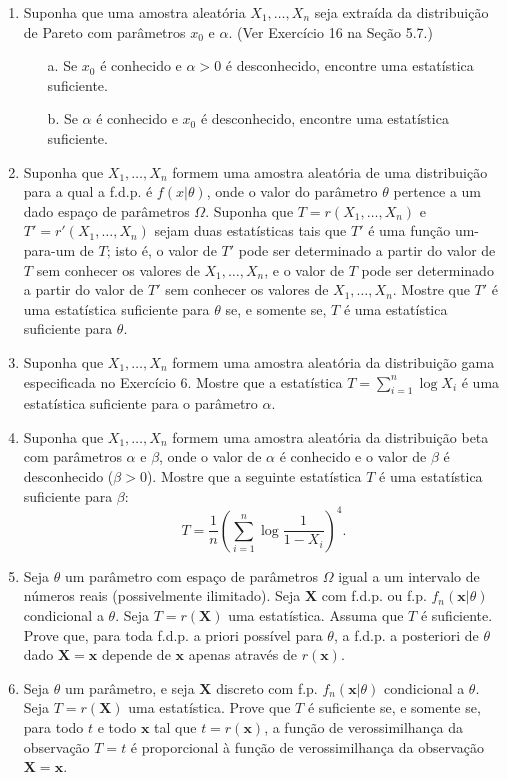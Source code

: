 \begin{enumerate}
    \item Suponha que uma amostra aleatória $X_1, \dots, X_n$ seja extraída da distribuição de Pareto com parâmetros $x_0$ e $\alpha$. (Ver Exercício 16 na Seção 5.7.)
    \begin{enumerate}
        \item[a.] Se $x_0$ é conhecido e $\alpha > 0$ é desconhecido, encontre uma estatística suficiente.
        \item[b.] Se $\alpha$ é conhecido e $x_0$ é desconhecido, encontre uma estatística suficiente.
    \end{enumerate}

    \item Suponha que $X_1, \dots, X_n$ formem uma amostra aleatória de uma distribuição para a qual a f.d.p. é $f(x|\theta)$, onde o valor do parâmetro $\theta$ pertence a um dado espaço de parâmetros $\Omega$. Suponha que $T = r(X_1, \dots, X_n)$ e $T' = r'(X_1, \dots, X_n)$ sejam duas estatísticas tais que $T'$ é uma função um-para-um de $T$; isto é, o valor de $T'$ pode ser determinado a partir do valor de $T$ sem conhecer os valores de $X_1, \dots, X_n$, e o valor de $T$ pode ser determinado a partir do valor de $T'$ sem conhecer os valores de $X_1, \dots, X_n$. Mostre que $T'$ é uma estatística suficiente para $\theta$ se, e somente se, $T$ é uma estatística suficiente para $\theta$.

    \item Suponha que $X_1, \dots, X_n$ formem uma amostra aleatória da distribuição gama especificada no Exercício 6. Mostre que a estatística $T = \sum_{i=1}^{n} \log X_i$ é uma estatística suficiente para o parâmetro $\alpha$.

        \item Suponha que $X_1, \dots, X_n$ formem uma amostra aleatória da distribuição beta com parâmetros $\alpha$ e $\beta$, onde o valor de $\alpha$ é conhecido e o valor de $\beta$ é desconhecido ($\beta > 0$). Mostre que a seguinte estatística $T$ é uma estatística suficiente para $\beta$:
    \[ T = \frac{1}{n}\left(\sum_{i=1}^{n} \log\frac{1}{1-X_i}\right)^4. \]

    \item Seja $\theta$ um parâmetro com espaço de parâmetros $\Omega$ igual a um intervalo de números reais (possivelmente ilimitado). Seja $\mathbf{X}$ com f.d.p. ou f.p. $f_n(\mathbf{x}|\theta)$ condicional a $\theta$. Seja $T=r(\mathbf{X})$ uma estatística. Assuma que $T$ é suficiente. Prove que, para toda f.d.p. a priori possível para $\theta$, a f.d.p. a posteriori de $\theta$ dado $\mathbf{X}=\mathbf{x}$ depende de $\mathbf{x}$ apenas através de $r(\mathbf{x})$.

    \item Seja $\theta$ um parâmetro, e seja $\mathbf{X}$ discreto com f.p. $f_n(\mathbf{x}|\theta)$ condicional a $\theta$. Seja $T=r(\mathbf{X})$ uma estatística. Prove que $T$ é suficiente se, e somente se, para todo $t$ e todo $\mathbf{x}$ tal que $t=r(\mathbf{x})$, a função de verossimilhança da observação $T=t$ é proporcional à função de verossimilhança da observação $\mathbf{X}=\mathbf{x}$.


\end{enumerate}